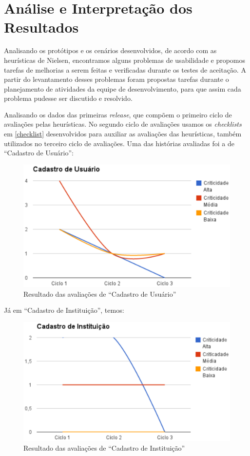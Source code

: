\section{Análise e Interpretação dos Resultados}
\label{analise}
Analisando os protótipos e os cenários desenvolvidos, de acordo com as heurísticas de Nielsen, encontramos alguns problemas de usabilidade e propomos tarefas de melhorias a serem feitas e verificadas durante os testes de aceitação.
%
A partir do levantamento desses problemas foram propostas tarefas durante o planejamento de atividades da equipe de desenvolvimento, para que assim cada problema pudesse ser discutido e resolvido.

Analisando os dados das primeiras \textit{release}, que compõem o primeiro ciclo de avaliações pelas heurísticas. No segundo ciclo de avaliações usamos os \textit{checklists} em \ref{checklist} desenvolvidos para auxiliar as avaliações das heurísticas, também utilizados no terceiro ciclo de avaliações. Uma das histórias avaliadas foi a de ``Cadastro de Usuário'':

\begin{figure}[h!]
    	\centering
    	\includegraphics[keepaspectratio=true,scale=0.62]
      		{figuras/graf01.eps}
    	\caption{Resultado das avaliações de ``Cadastro de Usuário''}
    	\label{avaliacaouser}
\end{figure}

Já em ``Cadastro de Instituição'', temos:

\begin{figure}[h!]
    	\centering
    	\includegraphics[keepaspectratio=true,scale=0.62]
      		{figuras/graf02.eps}
    	\caption{Resultado das avaliações de ``Cadastro de Instituição''}
    	\label{avaliacaoinstitucion}
\end{figure}

